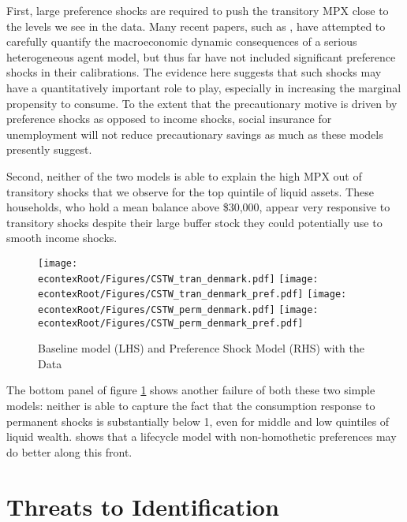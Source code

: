 \documentclass[titlepage]{\econtex}\newcommand{\texname}{ConsumptionHeterogeneity}
\begin{document}
First, large preference shocks are required to push the transitory MPX close to the levels we see in the data. Many recent papers, such as \cite{krueger_macroeconomics_2016}, have attempted to carefully quantify the macroeconomic dynamic consequences of a serious heterogeneous agent model, but thus far have not included significant preference shocks in their calibrations. The evidence here suggests that such shocks may have a quantitatively important role to play, especially in increasing the marginal propensity to consume. To the extent that the precautionary motive is driven by preference shocks as opposed to income shocks, social insurance for unemployment will not reduce precautionary savings as much as these models presently suggest.

Second, neither of the two models is able to explain the high MPX out of transitory shocks that we observe for the top quintile of liquid assets. These households, who hold a mean balance above \$30,000, appear very responsive to transitory shocks despite their large buffer stock they could potentially use to smooth income shocks.
\begin{figure} 
	\begin{centering}
		\texttt{[image: \\econtexRoot/Figures/CSTW\_tran\_denmark.pdf]}
		\texttt{[image: \\econtexRoot/Figures/CSTW\_tran\_denmark\_pref.pdf]}
		\texttt{[image: \\econtexRoot/Figures/CSTW\_perm\_denmark.pdf]}
\texttt{[image: \\econtexRoot/Figures/CSTW\_perm\_denmark\_pref.pdf]}
		\caption{Baseline model (LHS) and Preference Shock Model (RHS) with the Data}
		\label{fig:CSTW}
	\end{centering}
\end{figure}

The bottom panel of figure \ref{fig:CSTW} shows another failure of both these two simple models: neither is able to capture the fact that the consumption response to permanent shocks is substantially below 1, even for middle and low quintiles of liquid wealth. \cite{straub_consumption_2018} shows that a lifecycle model with non-homothetic preferences may do better along this front.

\section{Threats to Identification}
\end{document}
